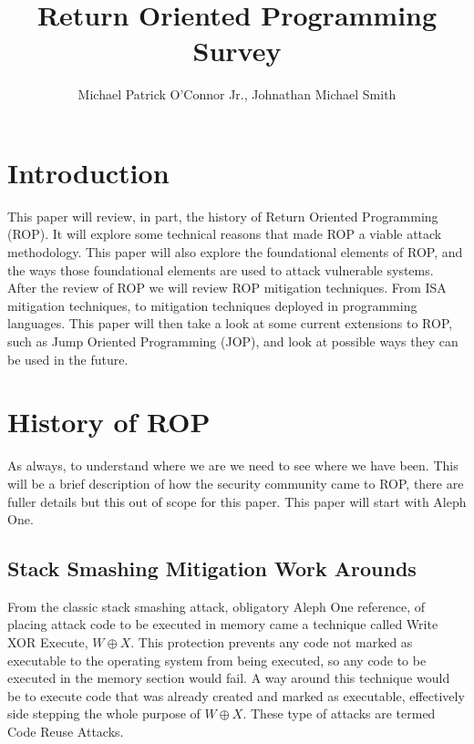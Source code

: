 \documentclass[11pt]{amsart}
\title{Return Oriented Programming Survey}
\author{Michael Patrick O'Connor Jr., Johnathan Michael Smith}
\date{}
\begin{document}
\maketitle

\newpage
\section*{Introduction}
This paper will review, in part, the history of Return Oriented Programming (ROP). It will explore some technical reasons that made ROP a viable attack methodology. This paper will also explore the foundational elements of ROP, and the ways those foundational elements are used to attack vulnerable systems. After the review of ROP we will review ROP mitigation techniques. From ISA mitigation techniques, to mitigation techniques deployed in programming languages. This paper will then take a look at some current extensions to ROP, such as Jump Oriented Programming (JOP), and look at possible ways they can be used in the future.
\section*{History of ROP}
As always, to understand where we are we need to see where we have been.  This will be a brief description of how the security community came to ROP, there are fuller details but this out of scope for this paper.  This paper will start with Aleph One.
\subsection*{Stack Smashing Mitigation Work Arounds}
From the classic stack smashing attack, obligatory Aleph One reference, of placing attack code to be executed in memory came a technique called Write XOR Execute, $W \oplus X$. This protection prevents any code not marked as executable to the operating system from being executed, so any code to be executed in the memory section would fail. A way around this technique would be to execute code that was already created and marked as executable, effectively side stepping the whole purpose of $W \oplus X$.  These type of attacks are termed Code Reuse Attacks.
\end{document}
